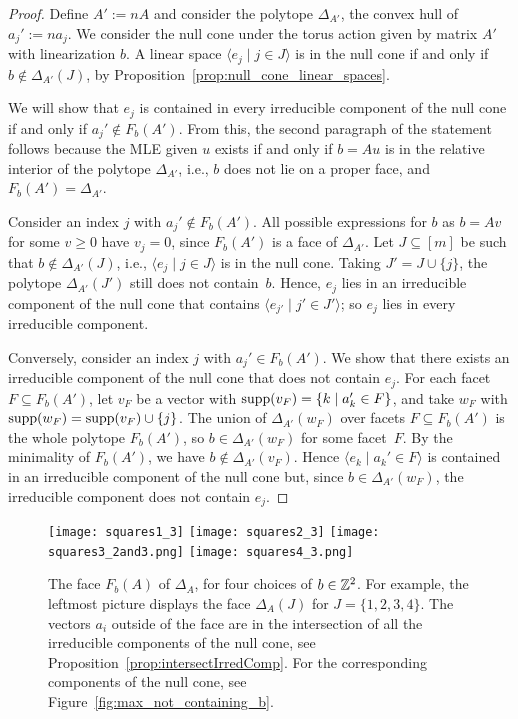 \begin{proof}
	Define $A' := n A$ and consider the polytope $\Delta_{A'}$, the convex hull of $a_j' := n a_j$.
	We consider the null cone under the torus action given by matrix $A'$ with linearization $b$. 
	A linear space $\langle e_j \mid j \in J \rangle$ is in the null cone if and only if $b \notin \Delta_{A'}(J)$, by Proposition~\ref{prop:null_cone_linear_spaces}.
	
	We will show that $e_j$ is contained in every irreducible component of the null cone if and only if $a_j' \notin F_b(A')$.
	From this, the second paragraph of the statement follows because the MLE given $u$ exists if and only if $b = Au$ is in the relative interior of the polytope $\Delta_{A'}$, i.e., $b$ does not lie on a proper face, and $F_b(A') = \Delta_{A'}$.
	
	Consider an index $j$ with $a_j' \notin F_b(A')$. 
	All possible expressions for $b$ as $b = Av$ for some $v\geq 0$ have $v_j = 0$, since $F_b(A')$ is a face of $\Delta_{A'}$.
	Let $J \subseteq [m]$ be
	such that $b \notin \Delta_{A'}(J)$, 
	i.e., $\langle e_j \mid j \in J \rangle$ is in the null cone.
	Taking $J' = J \cup \{ j \}$, the polytope $\Delta_{A'}(J')$ still does not contain~$b$.
	Hence, $e_j$ lies in an irreducible component of the null cone that contains $\langle e_{j'} \mid j' \in J' \rangle$;
	so $e_j$ lies in every irreducible component.
	
	Conversely, consider an index $j$ with $a_j' \in F_b(A')$. We show that there exists an irreducible component of the null cone that does not contain $e_j$. For each facet $F \subseteq F_b(A')$, let $v_F$ be a vector with $\operatorname{supp}(v_F) = \{ k \mid a_k' \in F \}$, and take $w_F$ with $\operatorname{supp}(w_F) = \operatorname{supp}(v_F) \cup \{ j \}$. The union of $\Delta_{A'}(w_F)$ over facets $F \subseteq F_b(A')$ is the whole polytope $F_b(A')$, so $b \in \Delta_{A'}(w_F)$ for some facet~$F$. 
	By the minimality of $F_b(A')$, we have $b \notin \Delta_{A'}(v_F)$.
	Hence $\langle e_k \mid a_k' \in F \rangle$ is contained in an irreducible component of the null cone but, since $b \in \Delta_{A'}(w_F)$, the irreducible component does not contain $e_j$. 
\end{proof}

\begin{figure}[htbp]
	\centering
	\texttt{[image: squares1\_3]} \qquad 
	\texttt{[image: squares2\_3]}
	\qquad
	\texttt{[image: squares3\_2and3.png]}
	\qquad
	\texttt{[image: squares4\_3.png]}
	\caption{{\cite[Figure~3]{DiscretePaper}} The face $F_b(A)$ of $\Delta_A$, for four choices of $b \in \mathbb Z^2$. 
		For example, the leftmost picture displays the face $\Delta_A(J)$ for $J = \{1,2,3,4\}$.
		The vectors $a_i$ outside of the face are in the intersection of all the irreducible components of the null cone, see Proposition~\ref{prop:intersectIrredComp}. For the corresponding components of the null cone, see Figure~\ref{fig:max_not_containing_b}.}
	\label{fig:faces_Fb}
\end{figure}



